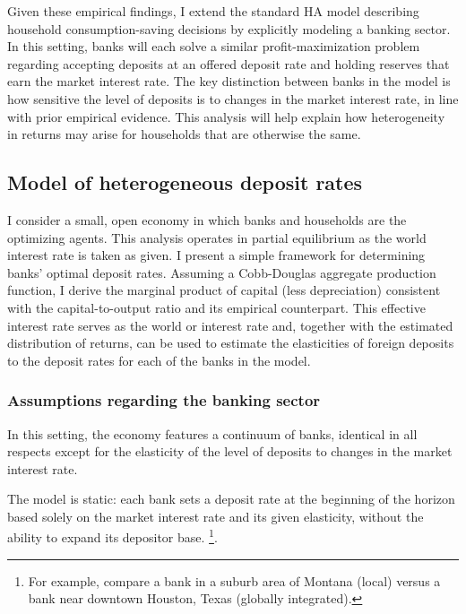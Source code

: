 \par Given these empirical findings, I extend the standard HA model describing household consumption-saving decisions by explicitly modeling a banking sector. In this setting, banks will each solve a similar profit-maximization problem regarding accepting deposits at an offered deposit rate and holding reserves that earn the market interest rate. The key distinction between banks in the model is how sensitive the level of deposits is to changes in the market interest rate, in line with prior empirical evidence. This analysis will help explain how heterogeneity in returns may arise for households that are otherwise the same.

\subsection{Model of heterogeneous deposit rates}

\par I consider a small, open economy in which banks and households are the optimizing agents. This analysis operates in partial equilibrium as the world interest rate is taken as given. I present a simple framework for determining banks' optimal deposit rates. Assuming a Cobb-Douglas aggregate production function, I derive the marginal product of capital (less depreciation) consistent with the capital-to-output ratio and its empirical counterpart. This effective interest rate serves as the world or  interest rate and, together with the estimated distribution of returns, can be used to estimate the elasticities of foreign deposits to the deposit rates for each of the banks in the model.  

\subsubsection{Assumptions regarding the banking sector}

\par In this setting, the economy features a continuum of banks, identical in all respects except for the elasticity of the level of deposits to changes in the market interest rate.

\par The model is static: each bank sets a deposit rate at the beginning of the horizon based solely on the market interest rate and its given elasticity, without the ability to expand its depositor base. \footnote{For example, compare a bank in a suburb area of Montana (local) versus a bank near downtown Houston, Texas (globally integrated).}.

